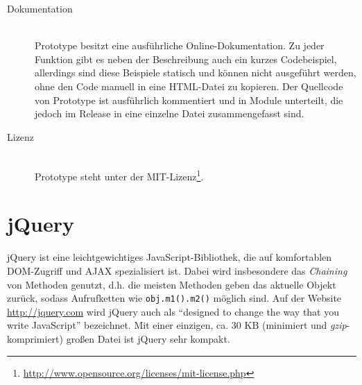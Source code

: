 \begin{description}
\item[Dokumentation] \hfill \\
Prototype besitzt eine ausführliche Online-Dokumentation. Zu jeder Funktion gibt es neben der
Beschreibung auch ein kurzes Codebeispiel, allerdings sind diese Beispiele statisch und können nicht
ausgeführt werden, ohne den Code manuell in eine HTML-Datei zu kopieren. Der Quellcode von Prototype
ist ausführlich kommentiert und in Module unterteilt, die jedoch im Release in eine einzelne Datei
zusammengefasst sind.

\item[Lizenz] \hfill \\
Prototype steht unter der
MIT-Lizenz\footnote{\href{http://www.opensource.org/licenses/mit-license.php}{http://www.opensource.org/licenses/mit-license.php}}.
\end{description}





\section{jQuery}
jQuery ist eine leichtgewichtiges JavaScript-Bibliothek, die auf komfortablen DOM-Zugriff und AJAX
spezialisiert ist. Dabei wird insbesondere das \emph{Chaining} von Methoden genutzt, d.h. die
meisten Methoden geben das aktuelle Objekt zurück, sodass Aufrufketten wie \lstinline{obj.m1().m2()}
möglich sind. Auf der Website \href{http://jquery.com}{http://jquery.com} wird jQuery auch als
\enquote{designed to change the way that you write JavaScript} bezeichnet. Mit einer einzigen, ca.
30 KB (minimiert und \emph{gzip}-komprimiert) großen Datei ist jQuery sehr kompakt.

